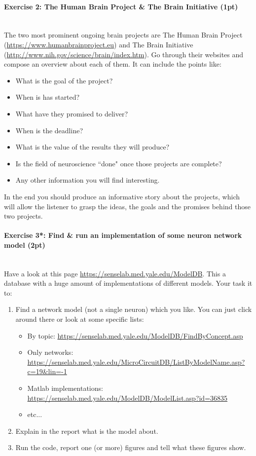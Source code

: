 \documentclass[a4paper,11pt]{article}
\newenvironment{exercise}[3]{\paragraph{Exercise #1: #2 (#3pt)}\ \\}{
\medskip}
\begin{document}
%
%
\begin{exercise}{2}{The Human Brain Project \& The Brain Initiative}{1}
The two most prominent ongoing brain projects are The Human Brain Project (\url{https://www.humanbrainproject.eu}) and The Brain Initiative (\url{http://www.nih.gov/science/brain/index.htm}). Go through their websites and compose an overview about each of them. It can include the points like:
\begin{itemize}
\itemsep 0em
	\item What is the goal of the project?
	\item When is has started?
	\item What have they promised to deliver?
	\item When is the deadline?
	\item What is the value of the results they will produce?
	\item Is the field of neuroscience ``done" once those projects are complete?
	\item Any other information you will find interesting.
\end{itemize}
In the end you should produce an informative story about the projects, which will allow the listener to grasp the ideas, the goals and the promises behind those two projects.
\end{exercise}


%
%
\begin{exercise}{3*}{Find \& run an implementation of some neuron network model}{2}
Have a look at this page \url{https://senselab.med.yale.edu/ModelDB}. This a database with a huge amount of implementations of different models. Your task it to:
\begin{enumerate}[label=\alph*)]
	\item Find a network model (not a single neuron) which you like. You can just click around there or look at some specific lists:
		\begin{itemize}
			\item By topic: \url{https://senselab.med.yale.edu/ModelDB/FindByConcept.asp}
			\item Only networks: \url{https://senselab.med.yale.edu/MicroCircuitDB/ListByModelName.asp?c=19&lin=-1}
			\item Matlab implementations: \url{https://senselab.med.yale.edu/ModelDB/ModelList.asp?id=36835}
			\item etc...
		\end{itemize}
	\item Explain in the report what is the model about.
	\item Run the code, report one (or more) figures and tell what these figures show.
\end{enumerate}
\end{exercise}
\end{document}
